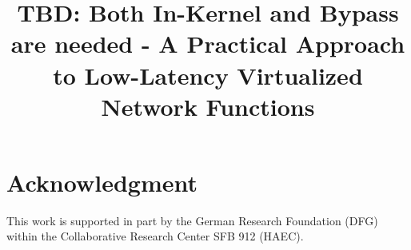 \documentclass[conference]{IEEEtran}
\begin{document}
\title{TBD: Both In-Kernel and Bypass are needed - A Practical Approach to Low-Latency Virtualized Network Functions}


\author{
}


\maketitle


%
%
%
%
%
%
%
%

\section*{Acknowledgment}
This work is supported in part by the German Research Foundation (DFG) within the Collaborative Research Center SFB 912 (HAEC).



\end{document}
